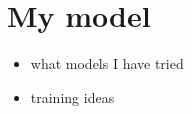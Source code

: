 \chapter{My model}

\begin{itemize}
    \item what models I have tried
    \item training ideas
\end{itemize}
